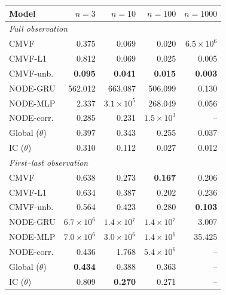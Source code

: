 \begin{tabular}{lrrrr}
\toprule
Model & $n{=}3$ & $n{=}10$ & $n{=}100$ & $n{=}1000$ \\
\midrule
\multicolumn{5}{l}{\emph{Full observation}} \\
CMVF & 0.375 & 0.069 & 0.020 & $6.5\!\times\!10^{6}$ \\
CMVF-L1 & 0.812 & 0.069 & 0.025 & 0.005 \\
CMVF-unb. & \textbf{0.095} & \textbf{0.041} & \textbf{0.015} & \textbf{0.003} \\
NODE-GRU & 562.012 & 663.087 & 506.099 & 0.130 \\
NODE-MLP & 2.337 & $3.1\!\times\!10^{5}$ & 268.049 & 0.056 \\
NODE-corr. & 0.285 & 0.231 & $1.5\!\times\!10^{3}$ & -- \\
Global ($\theta$) & 0.397 & 0.343 & 0.255 & 0.037 \\
IC ($\theta$) & 0.310 & 0.112 & 0.027 & 0.012 \\
\midrule
\multicolumn{5}{l}{\emph{First--last observation}} \\
CMVF & 0.638 & 0.273 & \textbf{0.167} & 0.206 \\
CMVF-L1 & 0.634 & 0.387 & 0.202 & 0.236 \\
CMVF-unb. & 0.564 & 0.423 & 0.280 & \textbf{0.103} \\
NODE-GRU & $6.7\!\times\!10^{6}$ & $1.4\!\times\!10^{7}$ & $1.4\!\times\!10^{7}$ & 3.007 \\
NODE-MLP & $7.0\!\times\!10^{6}$ & $3.0\!\times\!10^{6}$ & $1.4\!\times\!10^{6}$ & 35.425 \\
NODE-corr. & 0.436 & 1.768 & $5.4\!\times\!10^{6}$ & -- \\
Global ($\theta$) & \textbf{0.434} & 0.388 & 0.363 & -- \\
IC ($\theta$) & 0.809 & \textbf{0.270} & 0.271 & -- \\
\bottomrule
\end{tabular}
